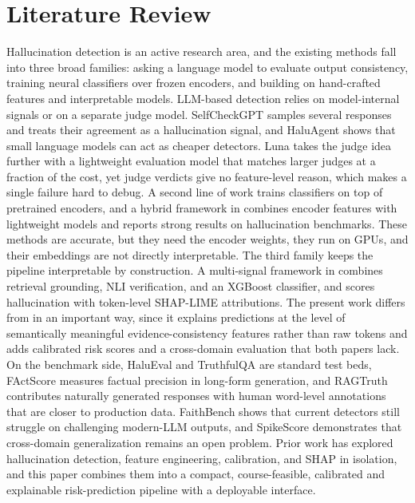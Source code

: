 \section{Literature Review}

Hallucination detection is an active research area, and the existing methods fall into three broad families: asking a language model to evaluate output consistency, training neural classifiers over frozen encoders, and building on hand-crafted features and interpretable models. LLM-based detection relies on model-internal signals or on a separate judge model. SelfCheckGPT \cite{selfcheck} samples several responses and treats their agreement as a hallucination signal, and HaluAgent \cite{haluagent} shows that small language models can act as cheaper detectors. Luna \cite{luna} takes the judge idea further with a lightweight evaluation model that matches larger judges at a fraction of the cost, yet judge verdicts give no feature-level reason, which makes a single failure hard to debug. A second line of work trains classifiers on top of pretrained encoders, and a hybrid framework in \cite{ieeeTai} combines encoder features with lightweight models and reports strong results on hallucination benchmarks. These methods are accurate, but they need the encoder weights, they run on GPUs, and their embeddings are not directly interpretable. The third family keeps the pipeline interpretable by construction. A multi-signal framework in \cite{ijert} combines retrieval grounding, NLI verification, and an XGBoost classifier, and \cite{multimedia} scores hallucination with token-level SHAP-LIME attributions. The present work differs from \cite{multimedia} in an important way, since it explains predictions at the level of semantically meaningful evidence-consistency features rather than raw tokens and adds calibrated risk scores and a cross-domain evaluation that both papers lack. On the benchmark side, HaluEval \cite{haluEval} and TruthfulQA \cite{truthqa} are standard test beds, FActScore \cite{factscore} measures factual precision in long-form generation, and RAGTruth \cite{ragtruth} contributes naturally generated responses with human word-level annotations that are closer to production data. FaithBench \cite{faithbench} shows that current detectors still struggle on challenging modern-LLM outputs, and SpikeScore \cite{spikescore} demonstrates that cross-domain generalization remains an open problem. Prior work has explored hallucination detection, feature engineering, calibration, and SHAP in isolation, and this paper combines them into a compact, course-feasible, calibrated and explainable risk-prediction pipeline with a deployable interface.
